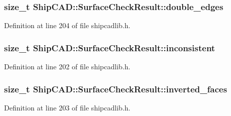 \subsubsection[{\texorpdfstring{double\+\_\+edges}{double_edges}}]{\setlength{\rightskip}{0pt plus 5cm}size\+\_\+t Ship\+C\+A\+D\+::\+Surface\+Check\+Result\+::double\+\_\+edges}\hypertarget{structShipCAD_1_1SurfaceCheckResult_ac9cd6a616b54cdfc8f2de4260810e751}{}\label{structShipCAD_1_1SurfaceCheckResult_ac9cd6a616b54cdfc8f2de4260810e751}


Definition at line 204 of file shipcadlib.\+h.

\subsubsection[{\texorpdfstring{inconsistent}{inconsistent}}]{\setlength{\rightskip}{0pt plus 5cm}size\+\_\+t Ship\+C\+A\+D\+::\+Surface\+Check\+Result\+::inconsistent}\hypertarget{structShipCAD_1_1SurfaceCheckResult_ac5c4a6c0d87e8020e469f4c06bd8c50d}{}\label{structShipCAD_1_1SurfaceCheckResult_ac5c4a6c0d87e8020e469f4c06bd8c50d}


Definition at line 202 of file shipcadlib.\+h.

\subsubsection[{\texorpdfstring{inverted\+\_\+faces}{inverted_faces}}]{\setlength{\rightskip}{0pt plus 5cm}size\+\_\+t Ship\+C\+A\+D\+::\+Surface\+Check\+Result\+::inverted\+\_\+faces}\hypertarget{structShipCAD_1_1SurfaceCheckResult_a80e73423275a12c1047605ceb59829d6}{}\label{structShipCAD_1_1SurfaceCheckResult_a80e73423275a12c1047605ceb59829d6}


Definition at line 203 of file shipcadlib.\+h.

